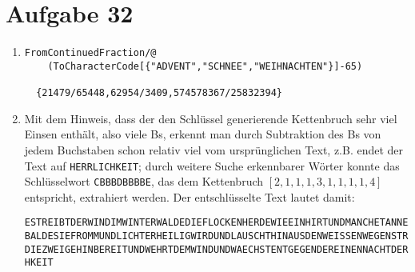 \section*{Aufgabe 32}
\begin{enumerate}
	\item
	\lstset{language=Mathematica}
	\begin{lstlisting}
FromContinuedFraction/@
	(ToCharacterCode[{"ADVENT","SCHNEE","WEIHNACHTEN"}]-65)

  {21479/65448,62954/3409,574578367/25832394}
	\end{lstlisting}
	\item Mit dem Hinweis, dass der den Schlüssel generierende Kettenbruch
	sehr viel Einsen enthält, also viele Bs, erkennt man durch Subtraktion
	des Bs von jedem Buchstaben schon relativ viel vom ursprünglichen Text,
	z.B. endet der Text auf \verb/HERRLICHKEIT/; durch weitere Suche
	erkennbarer Wörter konnte das Schlüsselwort \verb/CBBBDBBBBE/, das dem
	Kettenbruch $[2,1,1,1,3,1,1,1,1,4]$ entspricht, extrahiert werden. Der
	entschlüsselte Text lautet damit:

\begin{verbatim}
ESTREIBTDERWINDIMWINTERWALDEDIEFLOCKENHERDEWIEEINHIRTUNDMANCHETANNEAHNTWIE
BALDESIEFROMMUNDLICHTERHEILIGWIRDUNDLAUSCHTHINAUSDENWEISSENWEGENSTRECKTSIE
DIEZWEIGEHINBEREITUNDWEHRTDEMWINDUNDWAECHSTENTGEGENDEREINENNACHTDERHERRLIC
HKEIT
\end{verbatim}
\end{enumerate}


